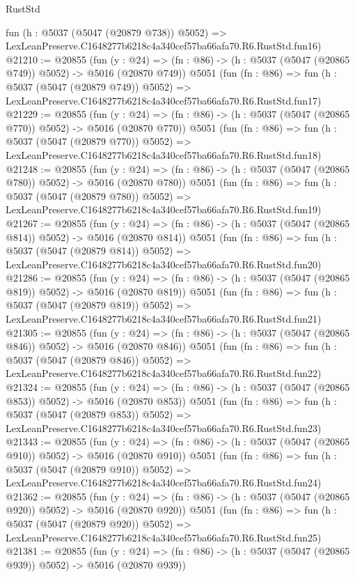 \begin{lexlean}{RustStd}
\begin{coremodule}
    fun (h : @5037 (@5047 (@20879 @738)) @5052) =>
    LexLeanPreserve.C1648277b6218c4a340cef57ba66afa70.R6.RustStd.fun16)
@21210 := @20855
    (fun (y : @24) => (fn : @86) -> (h : @5037 (@5047 (@20865 @749)) @5052) -> @5016 (@20870 @749))
    @5051
    (fun (fn : @86) =>
    fun (h : @5037 (@5047 (@20879 @749)) @5052) =>
    LexLeanPreserve.C1648277b6218c4a340cef57ba66afa70.R6.RustStd.fun17)
@21229 := @20855
    (fun (y : @24) => (fn : @86) -> (h : @5037 (@5047 (@20865 @770)) @5052) -> @5016 (@20870 @770))
    @5051
    (fun (fn : @86) =>
    fun (h : @5037 (@5047 (@20879 @770)) @5052) =>
    LexLeanPreserve.C1648277b6218c4a340cef57ba66afa70.R6.RustStd.fun18)
@21248 := @20855
    (fun (y : @24) => (fn : @86) -> (h : @5037 (@5047 (@20865 @780)) @5052) -> @5016 (@20870 @780))
    @5051
    (fun (fn : @86) =>
    fun (h : @5037 (@5047 (@20879 @780)) @5052) =>
    LexLeanPreserve.C1648277b6218c4a340cef57ba66afa70.R6.RustStd.fun19)
@21267 := @20855
    (fun (y : @24) => (fn : @86) -> (h : @5037 (@5047 (@20865 @814)) @5052) -> @5016 (@20870 @814))
    @5051
    (fun (fn : @86) =>
    fun (h : @5037 (@5047 (@20879 @814)) @5052) =>
    LexLeanPreserve.C1648277b6218c4a340cef57ba66afa70.R6.RustStd.fun20)
@21286 := @20855
    (fun (y : @24) => (fn : @86) -> (h : @5037 (@5047 (@20865 @819)) @5052) -> @5016 (@20870 @819))
    @5051
    (fun (fn : @86) =>
    fun (h : @5037 (@5047 (@20879 @819)) @5052) =>
    LexLeanPreserve.C1648277b6218c4a340cef57ba66afa70.R6.RustStd.fun21)
@21305 := @20855
    (fun (y : @24) => (fn : @86) -> (h : @5037 (@5047 (@20865 @846)) @5052) -> @5016 (@20870 @846))
    @5051
    (fun (fn : @86) =>
    fun (h : @5037 (@5047 (@20879 @846)) @5052) =>
    LexLeanPreserve.C1648277b6218c4a340cef57ba66afa70.R6.RustStd.fun22)
@21324 := @20855
    (fun (y : @24) => (fn : @86) -> (h : @5037 (@5047 (@20865 @853)) @5052) -> @5016 (@20870 @853))
    @5051
    (fun (fn : @86) =>
    fun (h : @5037 (@5047 (@20879 @853)) @5052) =>
    LexLeanPreserve.C1648277b6218c4a340cef57ba66afa70.R6.RustStd.fun23)
@21343 := @20855
    (fun (y : @24) => (fn : @86) -> (h : @5037 (@5047 (@20865 @910)) @5052) -> @5016 (@20870 @910))
    @5051
    (fun (fn : @86) =>
    fun (h : @5037 (@5047 (@20879 @910)) @5052) =>
    LexLeanPreserve.C1648277b6218c4a340cef57ba66afa70.R6.RustStd.fun24)
@21362 := @20855
    (fun (y : @24) => (fn : @86) -> (h : @5037 (@5047 (@20865 @920)) @5052) -> @5016 (@20870 @920))
    @5051
    (fun (fn : @86) =>
    fun (h : @5037 (@5047 (@20879 @920)) @5052) =>
    LexLeanPreserve.C1648277b6218c4a340cef57ba66afa70.R6.RustStd.fun25)
@21381 := @20855
    (fun (y : @24) => (fn : @86) -> (h : @5037 (@5047 (@20865 @939)) @5052) -> @5016 (@20870 @939))

\end{coremodule}
\end{lexlean}
